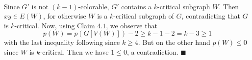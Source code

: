 \documentclass[letterpaper,12pt,oneside,onecolumn]{article}
\begin{document}
\paragraph{}
Since $G'$ is not $(k-1)$-colorable, $G'$ contains a $k$-critical subgraph $W$. Then $xy \in E(W)$, for otherwise $W$ is a $k$-critical subgraph of $G$, contradicting that $G$ is $k$-critical. Now, using Claim $4.1$, we observe that
$$p(W) = p(G[V(W)]) - 2 \geq k-1 - 2 = k-3 \geq 1 $$
with the last inequality following since $k \geq 4$. But on the other hand $p(W) \leq 0$ since $W$ is $k$-critical. Then we have $1 \leq 0$, a contradiction. $\blacksquare$
\end{document}

